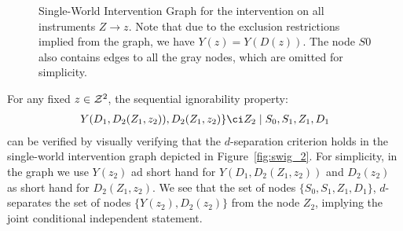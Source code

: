 \begin{figure}[H]
\caption{
  Single-World Intervention Graph for the intervention on all instruments $Z\to z$. Note that due to the exclusion restrictions implied from the graph, we have $Y(z) = Y(D(z))$. The node $S0$ also contains edges to all the gray nodes, which are omitted for simplicity.
}\label{fig:swig_1}
\end{figure}


For any fixed $z\in {\cal Z}^2$, the sequential ignorability property:
\begin{align}
    Y(D_1, D_2(Z_1, z_2)), D_2(Z_1, z_2)\} \ci Z_2 \mid S_0, S_1, Z_1, D_1
\end{align}
can be verified by visually verifying that the $d$-separation criterion holds in the single-world intervention graph depicted in Figure~\ref{fig:swig_2}. For simplicity, in the graph we use $Y(z_2)$ ad short hand for $Y(D_1, D_2(Z_1, z_2))$ and $D_2(z_2)$ as short hand for $D_2(Z_1, z_2)$. We see that the set of nodes $\{S_0, S_1, Z_1, D_1\}$, $d$-separates the set of nodes $\{Y(z_2), D_2(z_2)\}$ from the node $Z_2$, implying the joint conditional independent statement.

